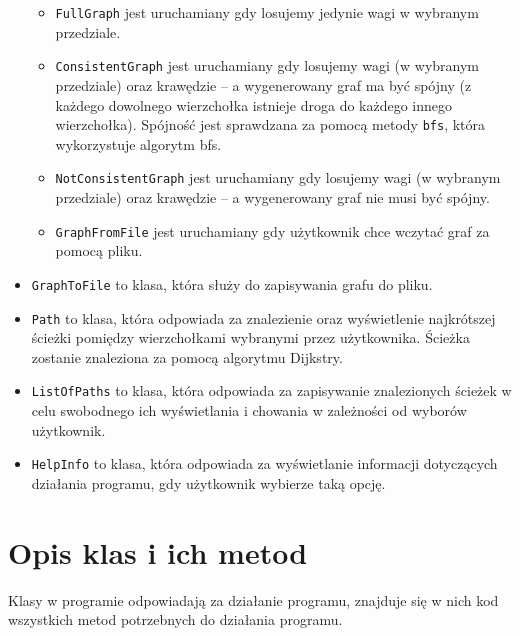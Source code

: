 \documentclass[12pt, a4paper]{article}
\begin{document}
\begin{itemize}
    \begin{itemize}
        \item \texttt{FullGraph} jest uruchamiany gdy losujemy jedynie wagi w wybranym przedziale.
        \item \texttt{ConsistentGraph} jest uruchamiany gdy losujemy wagi (w wybranym przedziale) oraz krawędzie -- a wygenerowany graf ma być spójny (z każdego dowolnego wierzchołka istnieje droga do każdego innego wierzchołka). Spójność jest sprawdzana za pomocą  metody \texttt{bfs}, która wykorzystuje algorytm bfs.
        \item \texttt{NotConsistentGraph} jest uruchamiany gdy losujemy wagi (w wybranym przedziale) oraz krawędzie -- a wygenerowany graf nie musi być spójny.
        \item \texttt{GraphFromFile} jest uruchamiany gdy użytkownik chce wczytać graf za pomocą pliku.
    \end{itemize}
    \item \texttt{GraphToFile} to klasa, która służy do zapisywania grafu do pliku.
    \item \texttt{Path} to klasa, która odpowiada za znalezienie oraz wyświetlenie najkrótszej ścieżki pomiędzy wierzchołkami wybranymi przez użytkownika. Ścieżka zostanie znaleziona za pomocą algorytmu Dijkstry.
    \item \texttt{ListOfPaths} to klasa, która odpowiada za zapisywanie znalezionych ścieżek w celu swobodnego ich wyświetlania i chowania w zależności od wyborów użytkownik.
    \item \texttt{HelpInfo} to klasa, która odpowiada za wyświetlanie informacji dotyczących działania programu, gdy użytkownik wybierze taką opcję.
\end{itemize}



\section{Opis klas i ich metod}
Klasy w programie odpowiadają za działanie programu, znajduje się w nich kod wszystkich metod potrzebnych do działania programu.
\end{document}
